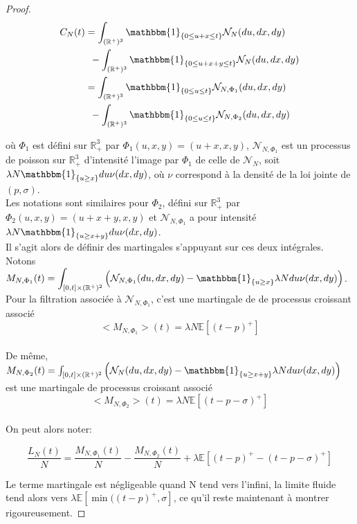 \documentclass[12pt,a4paper]{article}
\newcommand{\E}[1]{\mathbb{E}\left[ #1 \right]}
\newcommand{\R}{\mathbb{R}}
\newcommand{\1}[1]{\mathbbm{1}_{\{#1\}} }
\theoremstyle{definition}
\begin{document}
{\begin{proof}
\begin{align*}
C_N(t) &= \int_{(\R^+)^3} \1{0\leq u+x \leq t} \mathcal{N}_N(du,dx,dy)\\ &\,\,\,-
\int_{(\R^+)^3} \1{0\leq u+x+y \leq t} \mathcal{N}_N(du,dx,dy)\\
&= \int_{(\R^+)^3} \1{0\leq u \leq t} \mathcal{N}_{N,\Phi_1}(du,dx,dy)\\ &\,\,\,-
\int_{(\R^+)^3} \1{0\leq u \leq t} \mathcal{N}_{N,\Phi_2}(du,dx,dy)\\
\end{align*}

où $\Phi_1$ est défini sur $\R_+^3$ par $\Phi_1(u,x,y) = (u+x,x,y)$, $\mathcal{N}_{N,\Phi_1}$  est un processus de poisson sur $\R_+^3$ d'intensité l'image par $\Phi_1$ de celle de $\mathcal{N}_N$, soit $\lambda N \1{u\geq x}du\nu(dx,dy)$, où $\nu$ correspond à la densité de la loi jointe de $(p,\sigma)$.\\
Les notations sont similaires pour $\Phi_2$, défini sur $\R_+^3$ par $\Phi_2(u,x,y) = (u+x+y,x,y)$ et $\mathcal{N}_{N,\Phi_1}$ a pour intensité $\lambda N \1{u\geq x+y}du\nu(dx,dy)$.\\

Il s'agit alors de définir des martingales s'appuyant sur ces deux intégrales.\\

Notons $\displaystyle M_{N,\Phi_1}(t) = \int_{[0,t]\times (\R^+)^2}  \left(\mathcal{N}_{N,\Phi_1}(du,dx,dy)-\1{u\geq x}\lambda N du \nu(dx,dy)\right)$.\\
Pour la filtration associée à $\mathcal{N}_{N,\Phi_1}$, c'est une martingale de de processus croissant associé\\
  $$<M_{N,\Phi_1}>(t) = \lambda N \E{(t-p)^+}$$\\
  
De même, $M_{N,\Phi_2}(t) = \int_{[0,t]\times (\R^+)^2}  \left(\mathcal{N}_N(du,dx,dy)-\1{u\geq x+y }\lambda N du \nu(dx,dy)\right)$ est une martingale de processus croissant associé \\
$$<M_{N,\Phi_2}>(t) = \lambda N \E{(t-p-\sigma)^+}$$\\

On peut alors noter:

$$\frac{L_N(t)}{N} = \frac{M_{N,\Phi_1}(t)}{N} - \frac{M_{N,\Phi_2}(t)}{N} + \lambda  \E{(t-p)^+-(t-p-\sigma)^+}$$

Le terme martingale est négligeable quand N tend vers l'infini, la limite fluide tend alors vers $\lambda  \E{\min((t-p)^+,\sigma}$, ce qu'il reste maintenant à montrer rigoureusement.


\end{proof}}
\end{document}
